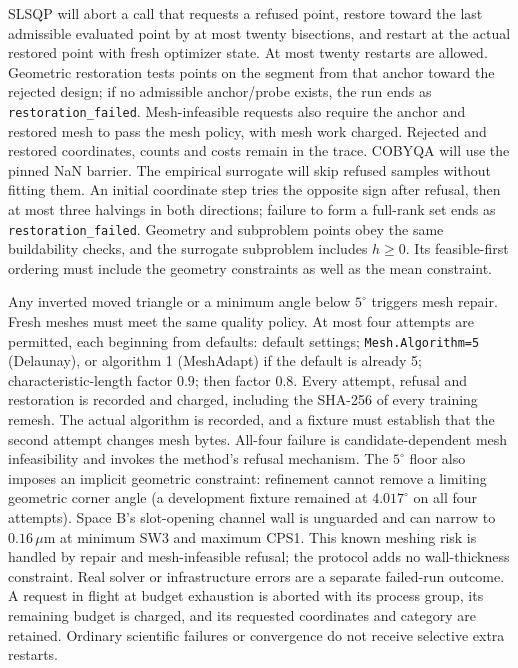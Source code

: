 SLSQP will abort a call that requests a refused point, restore toward the last
admissible evaluated point by at most twenty bisections, and restart at the
actual restored point with fresh optimizer state. At most twenty restarts
are allowed. Geometric restoration tests points on the segment from that
anchor toward the rejected design; if no admissible anchor/probe exists,
the run ends as \texttt{restoration\_failed}. Mesh-infeasible requests also
require the anchor and restored mesh to pass the mesh policy, with mesh work
charged. Rejected and restored coordinates, counts and costs remain in the
trace. COBYQA will use the pinned NaN barrier. The empirical surrogate
will skip refused samples without fitting them. An initial coordinate step
tries the opposite sign after refusal, then at most three halvings in both
directions; failure to form a full-rank set ends as
\texttt{restoration\_failed}. Geometry and subproblem points obey the same
buildability checks, and the surrogate subproblem includes $h\geq0$.
Its feasible-first ordering must include
the geometry constraints as well as the mean constraint.

Any inverted moved triangle or a minimum angle below $5^\circ$ triggers mesh
repair. Fresh meshes must meet the same quality policy. At most four attempts
are permitted, each beginning from defaults: default settings;
\texttt{Mesh.Algorithm=5} (Delaunay), or algorithm 1 (MeshAdapt) if the default is
already 5; characteristic-length
factor $0.9$; then factor $0.8$. Every attempt, refusal and restoration is
recorded and charged, including the SHA-256 of every training remesh.
The actual algorithm is recorded, and a fixture must establish that the
second attempt changes mesh bytes. All-four failure is candidate-dependent
mesh infeasibility and invokes the method's refusal mechanism.
The $5^\circ$ floor also imposes an implicit geometric constraint: refinement
cannot remove a limiting geometric corner angle (a development fixture
remained at $4.017^\circ$ on all four attempts). Space B's slot-opening
channel wall is unguarded and can narrow to $0.16\,\mu\mathrm{m}$ at
minimum SW3 and maximum CPS1. This known meshing risk is handled by repair
and mesh-infeasible refusal; the protocol adds no wall-thickness constraint.
Real solver or infrastructure errors are a
separate failed-run outcome. A request in flight at budget exhaustion is
aborted with its process group, its remaining budget is charged, and its
requested coordinates and category are retained. Ordinary scientific
failures or convergence do not receive selective extra restarts.

